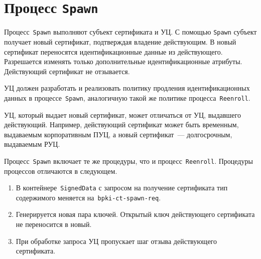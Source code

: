 \section{Процесс \texttt{Spawn}}\label{PROCESSES.Spawn}

Процесс~\texttt{Spawn} выполняют субъект сертификата и УЦ. 
С помощью \texttt{Spawn} субъект получает новый сертификат,
подтверждая владение действующим. В новый сертификат переносятся   
идентификационные данные из действующего. Разрешается изменять 
только дополнительные идентификационные атрибуты. Действующий 
сертификат не отзывается.

УЦ должен разработать и реализовать политику продления идентификационных 
данных в процессе~\texttt{Spawn}, аналогичную такой же политике 
процесса~\texttt{Reenroll}.

УЦ, который выдает новый сертификат, может отличаться от УЦ, выдавшего 
действующий. Например, действующий сертификат может быть временным, 
выдаваемым корпоративным ПУЦ, а новый сертификат~--- долгосрочным,
выдаваемым РУЦ.

Процесс~\texttt{Spawn} включает те же процедуры, что и
процесс~\texttt{Reenroll}. Процедуры процессов отличаются в следующем.

\begin{enumerate}
\item
В контейнере~\texttt{SignedData} с запросом на получение сертификата
тип содержимого меняется на~\texttt{bpki-ct-spawn-req}. 
\item
Генерируется новая пара ключей. Открытый ключ действующего сертификата
не переносится в новый.
\item
При обработке запроса УЦ пропускает шаг отзыва действующего сертификата. 
\end{enumerate}


